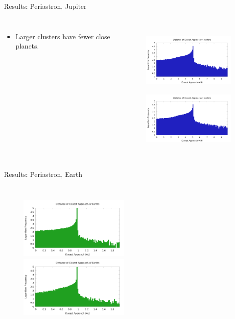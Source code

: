 \documentclass{beamer}
\begin{document}
\begin{frame}{Results: Periastron, Jupiter}
    \begin{columns}
        \begin{itemize}
            \item Larger clusters have fewer close planets.
        \end{itemize}
        \begin{figure}
            \includegraphics[height=1.20in]{periastron_jupiter_1000.png} \\
            \includegraphics[height=1.20in]{periastron_jupiter_4000.png}
        \end{figure}
    \end{columns}
\end{frame}

\begin{frame}{Results: Periastron, Earth}
    \begin{columns}
        \begin{figure}
            \includegraphics[height=1.20in]{periastron_earth_1000.png} \\
            \includegraphics[height=1.20in]{periastron_earth_4000.png}
        \end{figure}
    \end{columns}
\end{frame}
\end{document}
